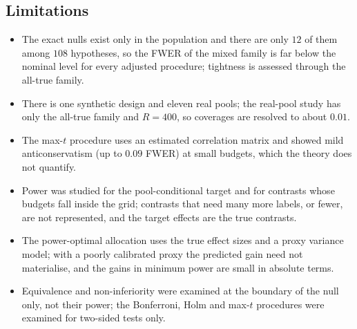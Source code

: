 \subsection{Limitations}
\begin{itemize}
\item The exact nulls exist only in the population and there are only $12$ of them among $108$ hypotheses, so the FWER of the mixed family is far below the nominal level for every adjusted procedure; tightness is assessed through the all-true family.
\item There is one synthetic design and eleven real pools; the real-pool study has only the all-true family and $R=400$, so coverages are resolved to about $0.01$.
\item The max-$t$ procedure uses an estimated correlation matrix and showed mild anticonservatism (up to $0.09$ FWER) at small budgets, which the theory does not quantify.
\item Power was studied for the pool-conditional target and for contrasts whose budgets fall inside the grid; contrasts that need many more labels, or fewer, are not represented, and the target effects are the true contrasts.
\item The power-optimal allocation uses the true effect sizes and a proxy variance model; with a poorly calibrated proxy the predicted gain need not materialise, and the gains in minimum power are small in absolute terms.
\item Equivalence and non-inferiority were examined at the boundary of the null only, not their power; the Bonferroni, Holm and max-$t$ procedures were examined for two-sided tests only.
\end{itemize}
